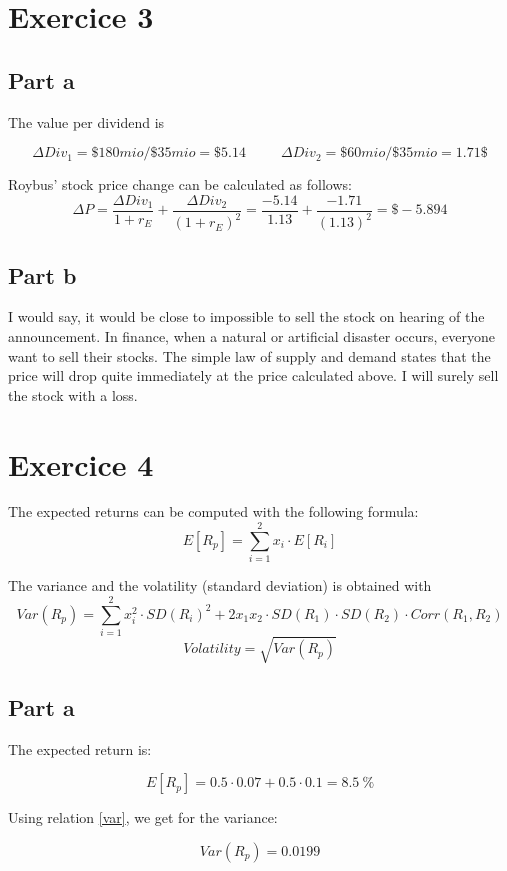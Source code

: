\documentclass[a4paper,11pt,twoside]{article}
\def \be {\begin{equation}}
\def \ee {\end{equation}}
\begin{document}
\section*{Exercice 3}

\subsection*{Part a}
The value per dividend is

\be
\Delta Div_1 = \$180mio/\$35mio=\$5.14
\hspace {30pt}
\Delta Div_2 = \$60mio/\$35mio=1.71\$
\ee

Roybus' stock price change can be calculated as follows:
\be
\Delta P = \frac{\Delta Div_1}{1 + r_E} + \frac{\Delta Div_2}{(1 + r_E)^2} = \frac{-5.14}{1.13} + \frac{-1.71}{(1.13)^2} = \$ -5.894
\ee
\subsection*{Part b}

I would say, it would be close to impossible to sell the stock on hearing of the announcement. In finance, when a natural or artificial disaster occurs, everyone want to sell their stocks. The simple law of supply and demand states that the price will drop quite immediately at the price calculated above. I will surely sell the stock with a loss. 
\section*{Exercice 4}

The expected returns can be computed with the following formula:
\be
E[R_p] = \sum_{i=1}^2 x_i \cdot E[R_i]
\ee

The variance and the volatility (standard deviation) is obtained with
\be
Var(R_p) = \sum_{i=1}^2 x_i^2 \cdot SD(R_i)^2 + 2x_1x_2 \cdot SD(R_1) \cdot SD(R_2)  \cdot  Corr(R_1,R_2)
\label{var}
\ee
\be
Volatility = \sqrt{Var(R_p)}
\ee

\subsection*{Part a}

The expected return is:

\be
E[R_p] =  0.5 \cdot 0.07 + 0.5 \cdot 0.1 = 8.5\ \%
\ee

Using relation \ref{var}, we get for the variance:

\be
Var(R_p) = 0.0199
\ee
\end{document}
